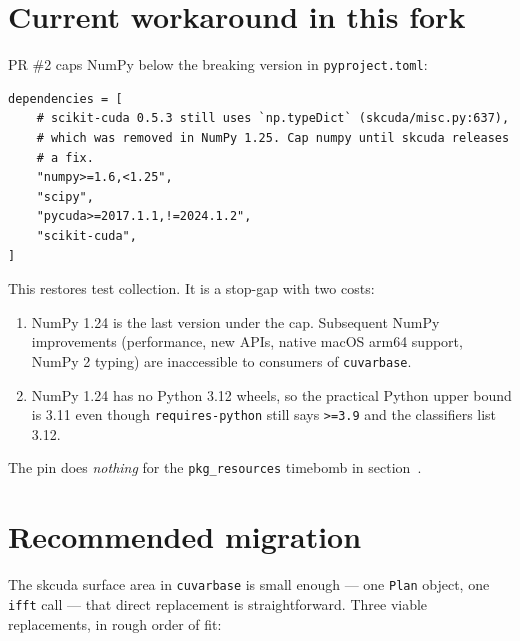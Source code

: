 \documentclass[11pt,a4paper]{article}
\begin{document}
\section{Current workaround in this fork}

PR \#2 caps NumPy below the breaking version in \texttt{pyproject.toml}:

\begin{lstlisting}[language=pyplus,caption={\texttt{pyproject.toml}}]
dependencies = [
    # scikit-cuda 0.5.3 still uses `np.typeDict` (skcuda/misc.py:637),
    # which was removed in NumPy 1.25. Cap numpy until skcuda releases
    # a fix.
    "numpy>=1.6,<1.25",
    "scipy",
    "pycuda>=2017.1.1,!=2024.1.2",
    "scikit-cuda",
]
\end{lstlisting}

\noindent
This restores test collection. It is a stop-gap with two costs:

\begin{enumerate}[leftmargin=1.6em]
    \item NumPy 1.24 is the last version under the cap. Subsequent NumPy
    improvements (performance, new APIs, native macOS arm64 support, NumPy 2
    typing) are inaccessible to consumers of \texttt{cuvarbase}.
    \item NumPy 1.24 has no Python 3.12 wheels, so the practical Python
    upper bound is 3.11 even though \texttt{requires-python} still says
    \texttt{>=3.9} and the classifiers list 3.12.
\end{enumerate}

The pin does \emph{nothing} for the \texttt{pkg\_resources} timebomb in
section~.

\section{Recommended migration}

The skcuda surface area in \texttt{cuvarbase} is small enough --- one
\texttt{Plan} object, one \texttt{ifft} call --- that direct replacement is
straightforward. Three viable replacements, in rough order of fit:
\end{document}
